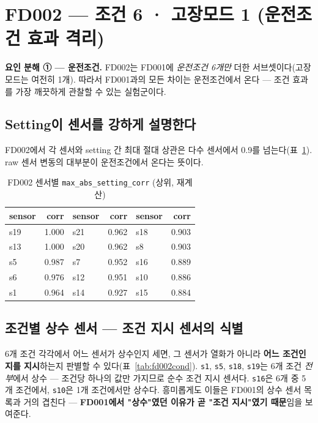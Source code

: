 \documentclass[11pt]{article}
\begin{document}
\section{FD002 — 조건 6 · 고장모드 1 (운전조건 효과 격리)}

\textbf{요인 분해 ① — 운전조건.}\quad
FD002는 FD001에 \emph{운전조건 6개만} 더한 서브셋이다(고장모드는 여전히 1개).
따라서 FD001과의 모든 차이는 운전조건에서 온다 — 조건 효과를 가장 깨끗하게 관찰할 수 있는 실험군이다.

\subsection{Setting이 센서를 강하게 설명한다}

FD002에서 각 센서와 setting 간 최대 절대 상관은 다수 센서에서 0.9를 넘는다(표~\ref{tab:fd002setcorr}).
raw 센서 변동의 대부분이 운전조건에서 온다는 뜻이다.

\begin{table}[H]
\centering
\caption{FD002 센서별 \texttt{max\_abs\_setting\_corr} (상위, 재계산)}
\label{tab:fd002setcorr}
\begin{tabular}{lr@{\hskip 2.2em}lr@{\hskip 2.2em}lr}
\toprule
sensor & corr & sensor & corr & sensor & corr \\
\midrule
s19 & 1.000 & s21 & 0.962 & s18 & 0.903 \\
s13 & 1.000 & s20 & 0.962 & s8  & 0.903 \\
s5  & 0.987 & s7  & 0.952 & s16 & 0.889 \\
s6  & 0.976 & s12 & 0.951 & s10 & 0.886 \\
s1  & 0.964 & s14 & 0.927 & s15 & 0.884 \\
\bottomrule
\end{tabular}
\end{table}

\subsection{조건별 상수 센서 — 조건 지시 센서의 식별}

6개 조건 각각에서 어느 센서가 상수인지 세면, 그 센서가 열화가 아니라 \textbf{어느 조건인지를 지시}하는지 판별할 수 있다(표~\ref{tab:fd002cond}).
\texttt{s1}, \texttt{s5}, \texttt{s18}, \texttt{s19}는 6개 조건 \emph{전부}에서 상수 — 조건당 하나의 값만 가지므로 순수 조건 지시 센서다.
\texttt{s16}은 6개 중 5개 조건에서, \texttt{s10}은 1개 조건에서만 상수다.
흥미롭게도 이들은 FD001의 상수 센서 목록과 거의 겹친다 — \textbf{FD001에서 "상수"였던 이유가 곧 "조건 지시"였기 때문}임을 보여준다.
\end{document}
